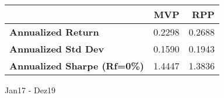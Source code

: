 
\begin{tabular}{lrr}
	\toprule
	                                    & MVP    & RPP    \\
	\midrule
	\textbf{Annualized Return}          & 0.2298 & 0.2688 \\
	\textbf{Annualized Std Dev}         & 0.1590 & 0.1943 \\
	\textbf{Annualized Sharpe (Rf=0\%)} & 1.4447 & 1.3836 \\
	\bottomrule
\end{tabular} \caption{Jan17 - Dez19}
